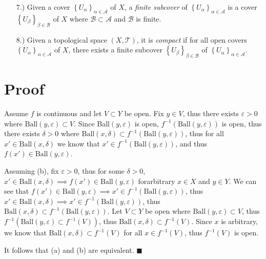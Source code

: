 \documentclass[11pt]{article}
\newcommand{\braces}[1]{\left\{#1\right\}}           %
\newcommand{\e}{\varepsilon}
\begin{document}
\begin{itemize}
    \item [7.)] Given a cover $\braces{U_\alpha}_{\alpha\in\mathcal{A}}$ of $X$, a \textit{finite subcover} of $\braces{U_\alpha}_{\alpha\in\mathcal{A}}$ is a cover $\braces{U_\beta}_{\beta\in\mathcal{B}}$ of $X$ where $\mathcal{B}\subset\mathcal{A}$ and $\mathcal{B}$ is finite.

    \item [8.)] Given a topological space $(X,\mathcal{T})$, it is \textit{compact} if for all open covers $\braces{U_\alpha}_{\alpha\in\mathcal{A}}$ of $X$, there exists a finite subcover $\braces{U_\beta}_{\beta\in\mathcal{B}}$ of $\braces{U_\alpha}_{\alpha\in\mathcal{A}}$.
\end{itemize}

\section*{Proof}
Assume $f$ is continuous and let $V\subset Y$ be open. Fix $y\in V$, thus there exists $\e>0$ where $\text{Ball}(y,\e)\subset V$. Since Ball$(y,\e)$ is open, $f^{-1}(\text{Ball}(y,\e))$ is open, thus there exists $\delta>0$ where $\text{Ball}(x,\delta)\subset f^{-1}(\text{Ball}(y,\e))$, thus for all $x'\in\text{Ball}(x,\delta)$ we know that $x'\in f^{-1}(\text{Ball}(y,\e))$, and thus $f(x')\in\text{Ball}(y,\e)$.

\noindent
Assuming (b), fix $\e>0$, thus for some $\delta>0$, $x'\in\text{Ball}(x,\delta)\implies f(x')\in\text{Ball}(y,\e)$ for\break arbitrary $x\in X$ and $y\in Y$. We can see that $f(x')\in\text{Ball}(y,\e)\implies x'\in f^{-1}(\text{Ball}(y,\e))$, thus $x'\in\text{Ball}(x,\delta)\implies x'\in f^{-1}(\text{Ball}(y,\e))$, thus $\text{Ball}(x,\delta)\subset f^{-1}(\text{Ball}(y,\e))$. Let $V\subset Y$ be open where $\text{Ball}(y,\e)\subset V$, thus $f^{-1}(\text{Ball}(y,\e)\subset f^{-1}(V))$, thus $\text{Ball}(x,\delta)\subset f^{-1}(V)$. Since $x$ is arbitrary, we know that $\text{Ball}(x,\delta)\subset f^{-1}(V)$ for all $x\in f^{-1}(V)$, thus $f^{-1}(V)$ is open.

\noindent
It follows that (a) and (b) are equivalent. $\blacksquare$
\end{document}
